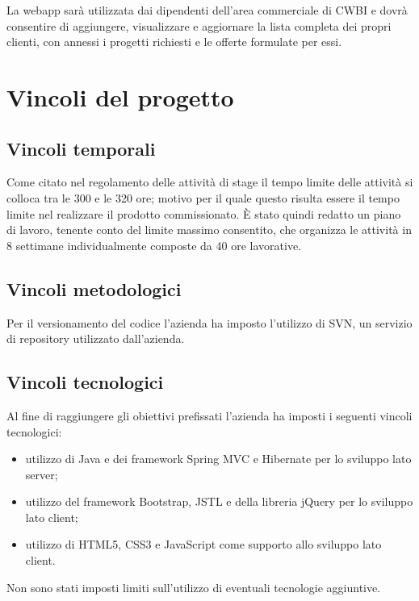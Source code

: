 \noindent La webapp sarà utilizzata dai dipendenti dell'area commerciale di CWBI e dovrà consentire di aggiungere, visualizzare e aggiornare la lista completa dei propri clienti, con annessi i progetti richiesti e le offerte formulate per essi. 

\setlength{\parskip}{3ex}

\section{Vincoli del progetto}
\subsection{Vincoli temporali}
Come citato nel regolamento delle attività di stage il tempo limite delle attività si colloca tra le 300 e le 320 ore; motivo per il quale questo risulta essere il tempo limite nel realizzare il prodotto commissionato. È stato quindi redatto un piano di lavoro, tenente conto del limite massimo consentito, che organizza le attività in 8 settimane individualmente composte da 40 ore lavorative.  

\subsection{Vincoli metodologici}
Per il versionamento del codice l'azienda ha imposto l'utilizzo di SVN, un servizio di repository utilizzato dall'azienda. 

\subsection{Vincoli tecnologici}
Al fine di raggiungere gli obiettivi prefissati l'azienda ha imposti i seguenti vincoli tecnologici:
\begin{itemize}
\item utilizzo di Java e dei framework Spring MVC e Hibernate per lo sviluppo lato server;
\item utilizzo del framework Bootstrap, JSTL e della libreria jQuery per lo sviluppo lato client;
\item utilizzo di HTML5, CSS3 e JavaScript come supporto allo sviluppo lato client.
\end{itemize}
Non sono stati imposti limiti sull’utilizzo di eventuali tecnologie aggiuntive.
